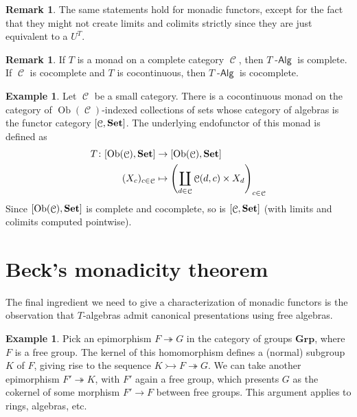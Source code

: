 \documentclass[a4paper,11pt,oneside,openany]{scrbook}
\newcommand{\catname}[1]{{\normalfont\textbf{#1}}}
\DeclareMathOperator{\Alg}{-\mathsf{Alg}}
\newcommand{\Set}{\catname{Set}}
\DeclareMathOperator{\C}{\mathcal{C}}
\DeclareMathOperator{\Ob}{Ob}
\theoremstyle{definition}
\theoremstyle{definition}
\newtheorem{rmk}[thm]{Remark}
\newtheorem{exmp}[thm]{Example}
\begin{document}
\begin{rmk}
	The same statements hold for monadic functors, except for the fact that they might not create limits and colimits strictly since they are just equivalent to a $U^T$.
\end{rmk}

\begin{rmk}
	If $T$ is a monad on a complete category $\C$, then $T\Alg$ is complete. If $\C$ is cocomplete and $T$ is cocontinuous, then $T\Alg$ is cocomplete.
\end{rmk}

\begin{exmp}
	Let $\C$ be a small category. There is a cocontinuous monad on the category of $\Ob(\C)$-indexed collections of sets whose category of algebras is the functor category $[\C,\Set]$. The underlying endofunctor of this monad is defined as 
	\begin{align*}
	T\colon[\Ob(\C),\Set]&\to[\Ob(\C),\Set] \\
	(X_c)_{c\in\C}&\mapsto \left(\coprod_{d\in\C}\C(d,c)\times X_d\right)_{c\in\C}
	\end{align*}
	Since $[\Ob(\C),\Set]$ is complete and cocomplete, so is $[\C,\Set]$ (with limits and colimits computed pointwise).
\end{exmp}
 
\section{Beck’s monadicity theorem}

The final ingredient we need to give a characterization of monadic functors is the observation that $T$-algebras admit canonical presentations using free algebras.

\begin{exmp}
	Pick an epimorphism $F\twoheadrightarrow G$ in the category of groups $\mathbf{Grp}$, where $F$ is a free group. The kernel of this homomorphism defines a (normal) subgroup $K$ of $F$, giving rise to the sequence $K\rightarrowtail F\twoheadrightarrow G$. We can take another epimorphism $F'\twoheadrightarrow K$, with $F'$ again a free group, which presents $G$ as the cokernel of some morphism $F'\to F$ between free groups. This argument applies to rings, algebras, etc.
\end{exmp}
\end{document}
